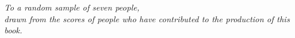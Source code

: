 \cleardoublepage
\thispagestyle{empty}
\begin{center}
\Large\itshape
To a random sample of seven people,\\ 
drawn from the scores of people who have contributed to the production of this book.
\end{center}
